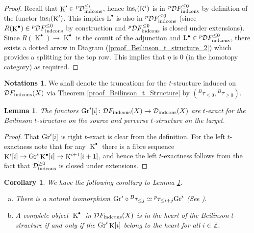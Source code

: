 \documentclass[12pt, reqno]{amsart}
\theoremstyle{plain}
\newtheorem{lem}[thm]{\bf Lemma}
\newtheorem{cor}[thm]{\bf Corollary}
\theoremstyle{definition}
\newtheorem{nota}[thm]{\bf Notations}
\theoremstyle{definition}
\newcommand{\bbZ}{{\mathbb Z}}
\newcommand{\cD}{{\mathcal D}}
\DeclareMathOperator{\KK}{K}
\begin{document}
\begin{proof}
Recall that $\KK' \in{}^p\cD_{\textup{indcons}}^{\leq i}$, hence $\textup{ins}_i(\KK')$ is in ${}^p\cD F_{\textup{indcons}}^{\leq 0}$ by definition of the functor $\textup{ins}_i(\KK')$. This implies $\mathrm{L}^{\bullet}$ is also in $^p\cD F_{\textup{indcons}}^{\leq 0}$ (since $R(\KK^{\bullet}) \in{}^p\cD F_{\textup{indcons}}^{\leq 0}$ by construction and ${}^p\cD F_{\textup{indcons}}^{\leq 0}$ is closed under extensions). Since $R(\KK^{\bullet}) \to \KK^{\bullet}$ is the counit of the adjunction and $\mathrm{L}^{\bullet} \in {}^p\cD F_{\textup{indcons}}^{\leq 0}$, there exists a dotted arrow in Diagram (\ref{proof_Beilinson_t_structure_2}) which provides a splitting for the top row. This implies that $\eta$ is $0$ (in the homotopy category) as required.
 
   
\end{proof}

\begin{nota}\label{Beilinson_t_structure_notat}
 We shall denote the truncations for the $t$-structure induced on $\cD F_{\textup{indcons}}(X)$ via Theorem \ref{proof_Beilinson_t_Structure} by $(^{B}\tau_{\leq 0},{}^{B}\tau_{\geq 0})$.
\end{nota}

\begin{lem}\label{Beilinson_t_structure_Gr_i}
The functors $\textup{Gr}^{i}[i] \colon \cD F_{\textup{indcons}}(X) \to \cD_{\textup{indcons}}(X)$ are $t$-exact for the Beilinson $t$-structure on the source and perverse $t$-structure on the target.
\end{lem}

\begin{proof}
That $\textup{Gr}^{i}[i]$ is right $t$-exact is clear from the definition. For the left $t$-exactness note that for any $\KK^{\bullet}$ there is a fibre sequence $\KK^{i}[i] \to \textup{Gr}^{i}\KK^{\bullet}[i] \to \KK^{i+1}[i+1]$, and hence the left $t$-exactness follows from the fact that $\cD^{\geq 0}_{\textup{indcons}}$ is closed under extensions.
\end{proof}


\begin{cor}\label{Beilinson_t_structure_Gr_i_Cor}
We have the following corollary to Lemma \ref{Beilinson_t_structure_Gr_i}.
    \begin{enumerate}[(a)]
        \item There is a natural isomorphism $\textup{Gr}^{i}\circ{}^{B}\tau_{\leq j} \simeq{}^p\tau_{\leq i+j}\textup{Gr}^{i}$ (See \cite[Theorem 5.4, (2)]{BMS19}).
        \item A complete object $\KK^{\bullet}$ in $\cD F_{\textup{indcons}}(X)$ is in the heart of the Beilinson $t$-structure if and only if the $\textup{Gr}^{i}\KK[i]$ belong to the heart for all $i \in \bbZ$.
    \end{enumerate}
\end{cor}
\end{document}
